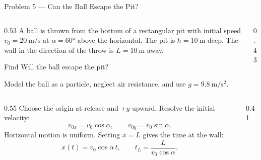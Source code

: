 \begin{frame}{Problem 5 — Can the Ball Escape the Pit?}
  \begin{columns}[T,onlytextwidth]
    \begin{column}{0.53\textwidth}
      \small
      A ball is thrown from the bottom of a rectangular pit with initial speed
      $v_0=\SI{20}{\metre\per\second}$ at $\alpha=\ang{60}$ above the horizontal.
      The pit is $h=\SI{10}{\metre}$ deep. The wall in the direction of the throw
      is $L=\SI{10}{\metre}$ away.
      \begin{block}{Find}
        Will the ball escape the pit?
      \end{block}
      \footnotesize
      Model the ball as a particle, neglect air resistance, and use
      $g=\SI{9.8}{\metre\per\second\squared}$.
    \end{column}
    \begin{column}{0.43\textwidth}
      \centering
      \resizebox{\linewidth}{!}{}
    \end{column}
  \end{columns}
\end{frame}

\begin{solutionframe}
  \begin{columns}[T,onlytextwidth]
    \begin{column}{0.55\textwidth}
      Choose the origin at release and $+y$ upward.
      Resolve the initial velocity:
      \[
        v_{0x}=v_0\cos\alpha,\qquad v_{0y}=v_0\sin\alpha.
      \]
      Horizontal motion is uniform. Setting $x=L$ gives the time at the wall:
      \[
        x(t)=v_0\cos\alpha\,t,
        \qquad t_L=\frac{L}{v_0\cos\alpha}.
      \]
    \end{column}
    \begin{column}{0.41\textwidth}
      \centering
      \resizebox{\linewidth}{!}{}
    \end{column}
  \end{columns}
\end{solutionframe}

